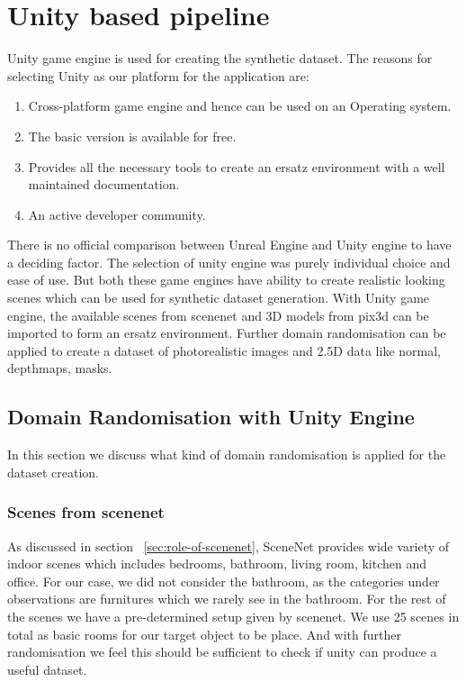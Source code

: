 \section{Unity based pipeline}\label{sec:unity-based-pipeline}
Unity game engine is used for creating the synthetic dataset.
The reasons for selecting Unity as our platform for the application are:
\begin{enumerate}
    \item Cross-platform game engine and hence can be used on an Operating system.
    \item The basic version is available for free.
    \item Provides all the necessary tools to create an ersatz environment with a well maintained documentation.
    \item An active developer community.
\end{enumerate}

There is no official comparison between Unreal Engine and Unity engine to have a deciding factor.
The selection of unity engine was purely individual choice and ease of use.
But both these game engines have ability to create realistic looking scenes which can be used for synthetic dataset generation.
With Unity game engine, the available scenes from scenenet and 3D models from pix3d can be imported to form an ersatz environment.
Further domain randomisation can be applied to create a dataset of photorealistic images and 2.5D data like normal, depthmaps, masks.

\subsection{Domain Randomisation with Unity Engine}\label{subsec:domain-randomisation-with-unity-engine}
In this section we discuss what kind of domain randomisation is applied for the dataset creation.
\subsubsection{Scenes from scenenet}\label{subsubsec:scenes-from-scenenet}
As discussed in section ~\ref{sec:role-of-scenenet}, SceneNet provides wide variety of indoor scenes which includes bedrooms, bathroom, living room, kitchen and office.
For our case, we did not consider the bathroom, as the categories under observations are furnitures which we rarely see in the bathroom.
For the rest of the scenes we have a pre-determined setup given by scenenet.
We use 25 scenes in total as basic rooms for our target object to be place.
And with further randomisation we feel this should be sufficient to check if unity can produce a useful dataset.

